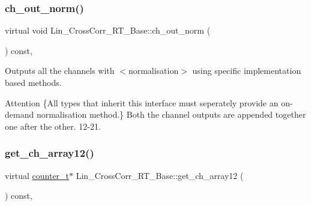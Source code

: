 \subsubsection{\texorpdfstring{ch\+\_\+out\+\_\+norm()}{ch\_out\_norm()}}
{\footnotesize\ttfamily virtual void Lin\+\_\+\+Cross\+Corr\+\_\+\+R\+T\+\_\+\+Base\+::ch\+\_\+out\+\_\+norm (\begin{DoxyParamCaption}{ }\end{DoxyParamCaption}) const\hspace{0.3cm}{\ttfamily [inline]}, {}}



Outputs all the channels with {\bfseries } $<$normalisation$>$ using specific implementation based methods. 

\begin{DoxyAttention}{Attention}
\{All types that inherit this interface must seperately provide an on-\/demand normalisation method.\} Both the channel outputs are appended together one after the other. 12-\/21. 
\end{DoxyAttention}
\mbox{\label{group__Lin__CorrCorr__Base__Out_gacc777900e8d232740373a70c1d5b4cce}} 
\subsubsection{\texorpdfstring{get\+\_\+ch\+\_\+array12()}{get\_ch\_array12()}}
{\footnotesize\ttfamily virtual \hyperlink{types_8hpp_a22f279793847eba127de149437848c48}{counter\+\_\+t}$\ast$ Lin\+\_\+\+Cross\+Corr\+\_\+\+R\+T\+\_\+\+Base\+::get\+\_\+ch\+\_\+array12 (\begin{DoxyParamCaption}{ }\end{DoxyParamCaption}) const\hspace{0.3cm}{\ttfamily [inline]}, {}}

